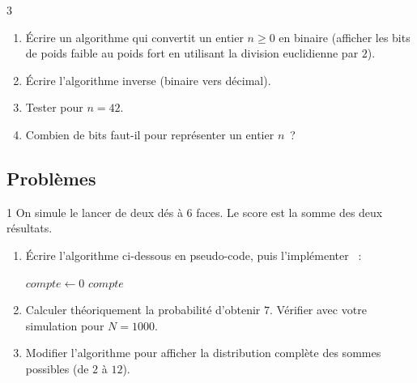 \begin{exo}{3}
\begin{enumerate}
  \item \'Ecrire un algorithme qui convertit un entier $n \geq 0$ en binaire
        (afficher les bits de poids faible au poids fort en utilisant
        la division euclidienne par $2$).
  \item \'Ecrire l'algorithme inverse (binaire vers d\'ecimal).
  \item Tester pour $n = 42$.
  \item Combien de bits faut-il pour repr\'esenter un entier $n$~?
\end{enumerate}
\end{exo}

\subsection*{Probl\`emes}

\begin{probleme}{1}
On simule le lancer de deux d\'es \`a 6 faces.
Le score est la somme des deux r\'esultats.
\begin{enumerate}
  \item \'Ecrire l'algorithme ci-dessous en pseudo-code, puis
        l'impl\'ementer \computer~:

\begin{algorithm}[H]
\caption{Simulation de $N$ lancers de d\'es}
$\mathit{compte} \leftarrow 0$\;
\Afficher $\mathit{compte}$\;
\end{algorithm}

  \item Calculer th\'eoriquement la probabilit\'e d'obtenir $7$.
        V\'erifier avec votre simulation pour $N = 1000$.
  \item Modifier l'algorithme pour afficher la distribution compl\`ete
        des sommes possibles (de $2$ \`a $12$).
\end{enumerate}
\end{probleme}

